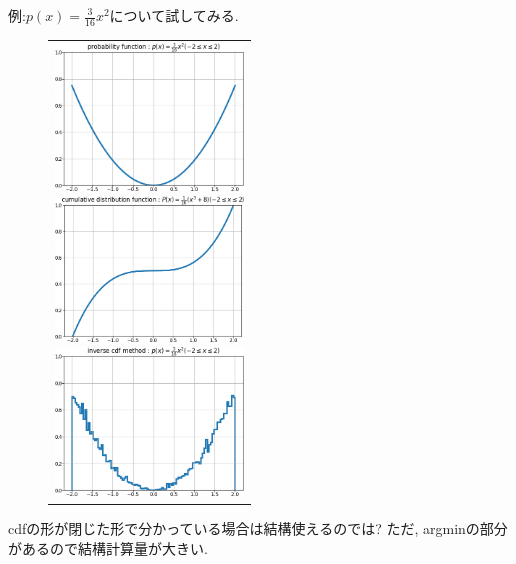 \documentclass[11pt,a4pape,dvipdfmx]{jarticle}
\begin{document}
例:$p(x)=\tfrac{3}{16}x^2$について試してみる.
\begin{figure}[H]
\begin{center}
\begin{tabular}{c}
\begin{minipage}{0.33\hsize}
\begin{center}
\includegraphics[clip, width=5cm]{../1/code/pf.png}
\end{center}
\end{minipage}
\begin{minipage}{0.33\hsize}
\begin{center}
\includegraphics[clip, width=5cm]{../1/code/cdf.png}
\end{center}
\end{minipage}
\begin{minipage}{0.33\hsize}
\begin{center}
\includegraphics[clip, width=5cm]{../1/code/inverse_cdf.png}
\end{center}
\end{minipage}
\end{tabular}
\end{center}
\end{figure}
cdfの形が閉じた形で分かっている場合は結構使えるのでは?
ただ, argminの部分があるので結構計算量が大きい.
\end{document}
